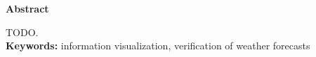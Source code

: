 
\begin{Huge}
\textbf{Abstract}  \\
\end{Huge}

TODO. \\

\textbf{Keywords:} information visualization, verification of weather forecasts